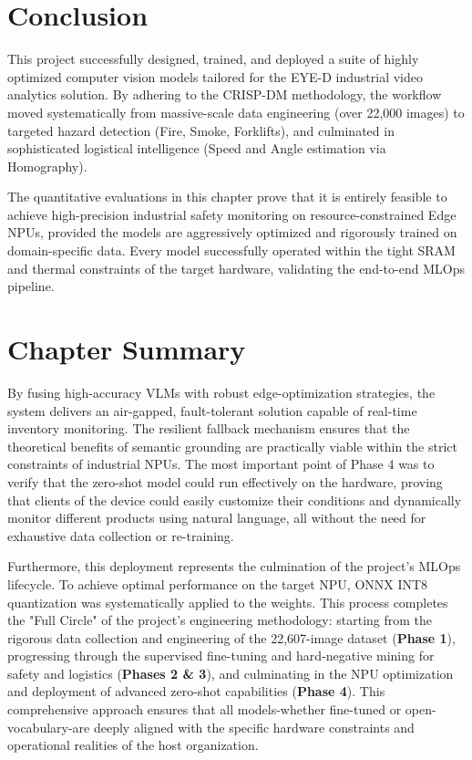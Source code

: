 \section{Conclusion}
This project successfully designed, trained, and deployed a suite of highly optimized computer vision models tailored for the EYE-D industrial video analytics solution. By adhering to the CRISP-DM methodology, the workflow moved systematically from massive-scale data engineering (over 22,000 images) to targeted hazard detection (Fire, Smoke, Forklifts), and culminated in sophisticated logistical intelligence (Speed and Angle estimation via Homography). 

The quantitative evaluations in this chapter prove that it is entirely feasible to achieve high-precision industrial safety monitoring on resource-constrained Edge NPUs, provided the models are aggressively optimized and rigorously trained on domain-specific data. Every model successfully operated within the tight SRAM and thermal constraints of the target hardware, validating the end-to-end MLOps pipeline.

\section{Chapter Summary}
By fusing high-accuracy VLMs with robust edge-optimization strategies, the system delivers an air-gapped, fault-tolerant solution capable of real-time inventory monitoring. The resilient fallback mechanism ensures that the theoretical benefits of semantic grounding are practically viable within the strict constraints of industrial NPUs. The most important point of Phase 4 was to verify that the zero-shot model could run effectively on the hardware, proving that clients of the device could easily customize their conditions and dynamically monitor different products using natural language, all without the need for exhaustive data collection or re-training.

Furthermore, this deployment represents the culmination of the project's MLOps lifecycle. To achieve optimal performance on the target NPU, ONNX INT8 quantization was systematically applied to the weights. This process completes the "Full Circle" of the project's engineering methodology: starting from the rigorous data collection and engineering of the 22,607-image dataset (\textbf{Phase 1}), progressing through the supervised fine-tuning and hard-negative mining for safety and logistics (\textbf{Phases 2 \& 3}), and culminating in the NPU optimization and deployment of advanced zero-shot capabilities (\textbf{Phase 4}). This comprehensive approach ensures that all models-whether fine-tuned or open-vocabulary-are deeply aligned with the specific hardware constraints and operational realities of the host organization.


